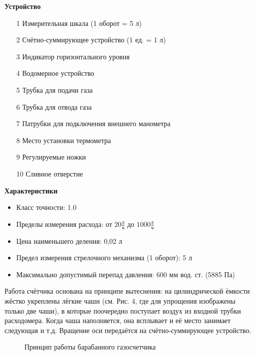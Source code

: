 \textbf{Устройство}
\begin{itemize}
    \item[1] 
    Измерительная шкала (1 оборот = 5 л)
    \item[2]
    Счётно-суммирующее устройство (1 ед. = 1 л)
    \item[3]
    Индикатор горизонтального уровня
    \item[4]
    Водомерное устройство
    \item[5] 
    Трубка для подачи газа
    \item[6] 
    Трубка для отвода газа
    \item[7] 
    Патрубки для подключения внешнего манометра
    \item[8] 
    Место установки термометра
    \item[9] 
    Регулируемые ножки
    \item[10]
    Сливное отверстие
\end{itemize}

\textbf{Характеристики}
\begin{itemize}
    \item 
    Класс точности: 1.0
    \item
    Пределы измерения расхода: от $20 \frac{\text{л}}{\text{ч}}$ до $1000 \frac{\text{л}}{\text{ч}}$
    \item
    Цена наименьшего деления: 0,02 л
    \item
    Предел измерения стрелочного механизма (1 оборот): 5 л
    \item
    Максимально допустимый перепад давления: 600 мм вод. ст. (5885 Па)
\end{itemize}

Работа счётчика основана на принципе вытеснения: на цилиндрической ёмкости жёстко укреплены лёгкие чаши (см. Рис. 4, где для упрощения изображены только две чаши), в которые поочередно поступает воздух из входной трубки расходомера. Когда чаша наполняется, она всплывает и её место занимает следующая и т.д. Вращение оси передаётся на счётно-суммирующее устройство.

\begin{figure}[ht]
    \label{figure4}
    \caption{Принцип работы барабанного газосчетчика}
\end{figure}
\newpage
